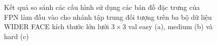 {    \begin{figure}[H]
        \centering
        \caption{Kết quả so sánh các cấu hình sử dụng các bản đồ đặc trưng của FPN làm đầu vào cho nhánh tập trung đối tượng trên ba bộ dữ liệu WIDER FACE kích thước lớn lưới $3 \times 3$ val easy (a), medium (b) và hard (c)}
        \label{fig:retinafocus_widerface_4k_val_fpn}
    \end{figure}

}
